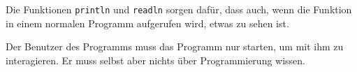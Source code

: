 \label{39b7e342-1083-4272-a839-d97d59230afe}
\begin{Shaded}
\begin{Highlighting}[]
 \OperatorTok{():} \OperatorTok{\{}
\OperatorTok{(}\OperatorTok{)}
      \OperatorTok{=}\OperatorTok{()}
\OperatorTok{(}\OperatorTok{(}\OperatorTok{))}
\OperatorTok{\}}
\end{Highlighting}
\end{Shaded}

\label{7f7cacfa-c34a-407f-88bb-6c6808d72a04}
Die Funktionen \texttt{println} und \texttt{readln} sorgen dafür, dass
auch, wenn die Funktion in einem normalen Programm aufgerufen wird,
etwas zu sehen ist.

\label{e3239b23-7264-41d3-9d0c-43ae82ce3d6f}
Der Benutzer des Programms muss das Programm nur starten, um mit ihm zu
interagieren. Er muss selbst aber nichts über Programmierung wissen.
